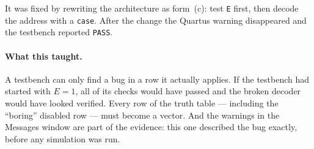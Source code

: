 It was fixed by rewriting the architecture as form~(c): test \texttt{E} first, then
decode the address with a \texttt{case}. After the change the Quartus warning
disappeared and the testbench reported \texttt{PASS}.

\paragraph{What this taught.} A testbench can only find a bug in a row it actually
applies. If the testbench had started with $E = 1$, all of its checks would have
passed and the broken decoder would have looked verified. Every row of the truth
table --- including the ``boring'' disabled row --- must become a vector. And the
warnings in the Messages window are part of the evidence: this one described the
bug exactly, before any simulation was run.

